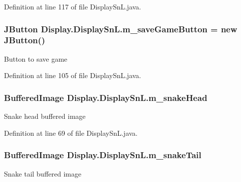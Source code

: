 Definition at line 117 of file Display\+Sn\+L.\+java.

\hypertarget{class_display_1_1_display_sn_l_a7ae26c71761566ba21e8eb4e4981969f}{}
\subsubsection[{m\+\_\+save\+Game\+Button}]{\setlength{\rightskip}{0pt plus 5cm}J\+Button Display.\+Display\+Sn\+L.\+m\+\_\+save\+Game\+Button = new J\+Button()\hspace{0.3cm}{\ttfamily [private]}}\label{class_display_1_1_display_sn_l_a7ae26c71761566ba21e8eb4e4981969f}
Button to save game 

Definition at line 105 of file Display\+Sn\+L.\+java.

\hypertarget{class_display_1_1_display_sn_l_ad8119225e6027adeced313ef342b67a2}{}
\subsubsection[{m\+\_\+snake\+Head}]{\setlength{\rightskip}{0pt plus 5cm}Buffered\+Image Display.\+Display\+Sn\+L.\+m\+\_\+snake\+Head\hspace{0.3cm}{\ttfamily [private]}}\label{class_display_1_1_display_sn_l_ad8119225e6027adeced313ef342b67a2}
Snake head buffered image 

Definition at line 69 of file Display\+Sn\+L.\+java.

\hypertarget{class_display_1_1_display_sn_l_a6821965beb6bde17ff10f6e3e09f3287}{}
\subsubsection[{m\+\_\+snake\+Tail}]{\setlength{\rightskip}{0pt plus 5cm}Buffered\+Image Display.\+Display\+Sn\+L.\+m\+\_\+snake\+Tail\hspace{0.3cm}{\ttfamily [private]}}\label{class_display_1_1_display_sn_l_a6821965beb6bde17ff10f6e3e09f3287}
Snake tail buffered image 

